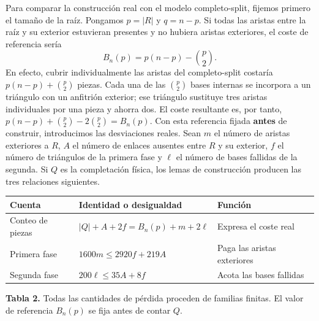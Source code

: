 \documentclass[spanish,11pt,a4paper]{article}
\newcounter{none}
\begin{document}
Para comparar la construcción real con el modelo completo-split, fijemos primero el tamaño de la raíz. Pongamos \(p=|R|\) y \(q=n-p\). Si todas las aristas entre la raíz y su exterior estuvieran presentes y no hubiera aristas exteriores, el coste de referencia sería \[
B_n(p)=p(n-p)-\binom p2.
\] En efecto, cubrir individualmente las aristas del completo-split costaría \(p(n-p)+\binom p2\) piezas. Cada una de las \(\binom p2\) bases internas se incorpora a un triángulo con un anfitrión exterior; ese triángulo sustituye tres aristas individuales por una pieza y ahorra dos. El coste resultante es, por tanto, \(p(n-p)+\binom p2-2\binom p2=B_n(p)\). Con esta referencia fijada \textbf{antes} de construir, introducimos las desviaciones reales. Sean \(m\) el número de aristas exteriores a \(R\), \(A\) el número de enlaces ausentes entre \(R\) y su exterior, \(f\) el número de triángulos de la primera fase y \(\ell\) el número de bases fallidas de la segunda. Si \(Q\) es la completación física, los lemas de construcción producen las tres relaciones siguientes.


{\def\LTcaptype{none} %
\begin{longtable}[c]{@{}
  >{\raggedright\arraybackslash}p{}
  >{\raggedright\arraybackslash}p{}
  >{\raggedright\arraybackslash}p{}@{}}
\toprule\noalign{}
\begin{minipage}[b]{\linewidth}\raggedright
Cuenta
\end{minipage} & \begin{minipage}[b]{\linewidth}\raggedright
Identidad o desigualdad
\end{minipage} & \begin{minipage}[b]{\linewidth}\raggedright
Función
\end{minipage} \\
\midrule\noalign{}
\endhead
\bottomrule\noalign{}
\endlastfoot
Conteo de piezas & \(|Q|+A+2f=B_n(p)+m+2\ell\) & Expresa el coste real \\
Primera fase & \(1600m\le2920f+219A\) & Paga las aristas exteriores \\
Segunda fase & \(200\ell\le35A+8f\) & Acota las bases fallidas \\
\end{longtable}
}

\textbf{Tabla 2.} Todas las cantidades de pérdida proceden de familias finitas. El valor de referencia \(B_n(p)\) se fija antes de contar \(Q\).
\end{document}
